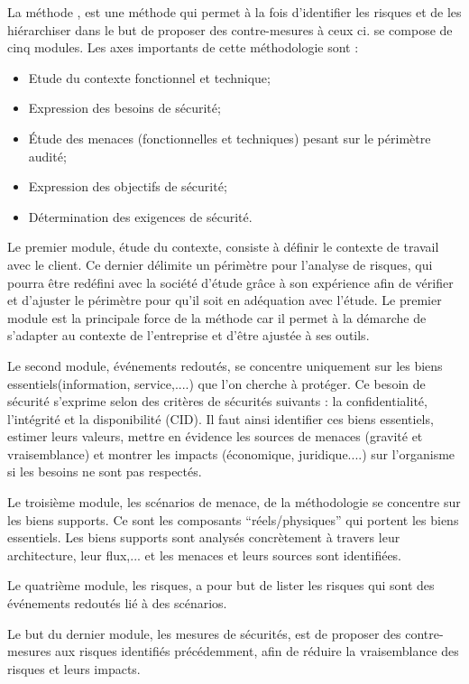 La méthode  , est une méthode qui permet à la fois d’identifier les risques et de les hiérarchiser dans le but de proposer des contre-mesures à ceux ci. 
 se compose de cinq modules. Les axes importants de cette méthodologie sont :

\begin{itemize}
  \item Etude du contexte fonctionnel et technique;
  \item Expression des besoins de sécurité;
  \item Étude des menaces (fonctionnelles et techniques) pesant sur le périmètre audité;
  \item Expression des objectifs de sécurité;
  \item Détermination des exigences de sécurité.
\end{itemize}

Le premier module, étude du contexte, consiste à définir le contexte de travail avec le client. Ce dernier délimite un périmètre pour l’analyse de risques, qui pourra être redéfini avec la société d’étude grâce à son expérience afin de vérifier et d’ajuster le périmètre pour qu’il soit en adéquation avec l’étude. Le premier module est la principale force de la méthode  car il permet à la démarche de s’adapter au contexte de l’entreprise et d’être ajustée à ses outils.

Le second module, événements redoutés, se concentre uniquement sur les biens essentiels(information, service,....) que l’on cherche à protéger. Ce besoin de sécurité s’exprime selon des critères de sécurités suivants : la confidentialité, l’intégrité et la disponibilité (CID). Il faut ainsi identifier ces biens essentiels, estimer leurs valeurs, mettre en évidence les sources de menaces (gravité et vraisemblance) et montrer les impacts (économique, juridique....) sur l’organisme si les besoins ne sont pas respectés.

Le troisième module, les scénarios de menace, de la méthodologie  se concentre sur les biens supports. Ce sont les composants “réels/physiques” qui portent les biens essentiels. Les biens supports sont analysés concrètement à travers leur architecture, leur flux,... et les menaces et leurs sources sont identifiées.

Le quatrième module, les risques, a pour but de lister les risques qui sont des événements redoutés lié à des scénarios.

Le but du dernier module, les mesures de sécurités, est de proposer des contre-mesures aux risques identifiés précédemment, afin de réduire la vraisemblance des risques et leurs impacts.

